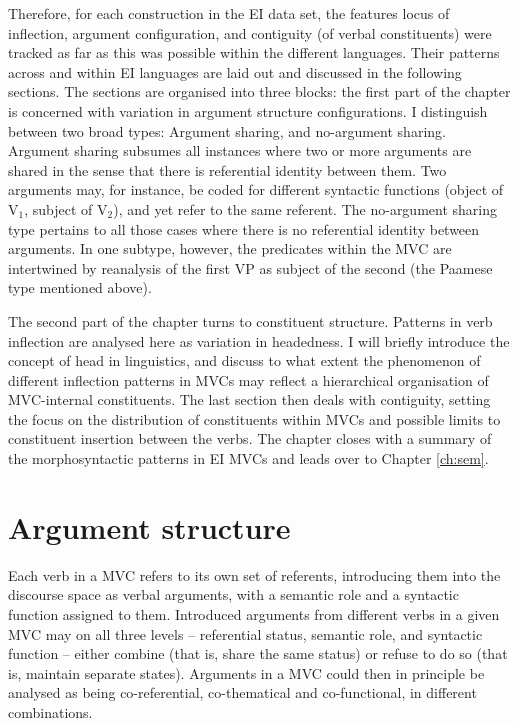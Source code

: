 Therefore, for each construction in the EI data set, the features locus of inflection, argument configuration, and contiguity (of verbal constituents) were tracked as far as this was possible within the different languages. Their patterns across and within EI languages are laid out and discussed in the following sections. The sections are organised into three blocks: the first part of the chapter is concerned with variation in argument structure configurations. I distinguish between two broad types: Argument sharing, and no-argument sharing. Argument sharing subsumes all instances where two or more arguments are shared in the sense that there is referential identity between them. Two arguments may, for instance, be coded for different syntactic functions (object of V$_1$, subject of V$_2$), and yet refer to the same referent. The no-argument sharing type pertains to all those cases where there is no referential identity between arguments. In one subtype, however, the predicates within the MVC are intertwined by reanalysis of the first VP as subject of the second (the Paamese type mentioned above).

The second part of the chapter turns to constituent structure. Patterns in verb inflection are analysed here as variation in headedness. I will briefly introduce the concept of head in linguistics, and discuss to what extent the phenomenon of different inflection patterns in MVCs may reflect a hierarchical organisation of MVC-internal constituents. The last section then deals with contiguity, setting the focus on the distribution of constituents within MVCs and possible limits to constituent insertion between the verbs. The chapter closes with a summary of the morphosyntactic patterns in EI MVCs and leads over to Chapter \ref{ch:sem}.

\section{Argument structure}\label{sec:argumentstructure}

Each verb in a MVC refers to its own set of referents, introducing them into the discourse space as verbal arguments, with a semantic role and a syntactic function assigned to them. Introduced arguments from different verbs in a given MVC may on all three levels -- referential status, semantic role, and syntactic function -- either combine (that is, share the same status) or refuse to do so (that is, maintain separate states). Arguments in a MVC could then in principle be analysed as being co-referential, co-thematical and co-functional, in different combinations. 

